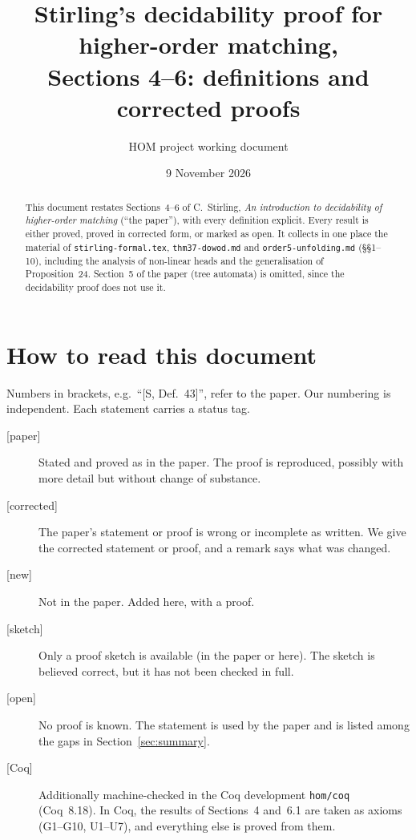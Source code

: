 \documentclass[11pt]{article}
\title{Stirling's decidability proof for higher-order matching,\\
Sections 4--6: definitions and corrected proofs}
\author{HOM project working document}
\date{9 November 2026}
\newcommand{\Paper}{\textsf{[paper]}}
\newcommand{\Fixed}{\textsf{[corrected]}}
\newcommand{\New}{\textsf{[new]}}
\newcommand{\Sketch}{\textsf{[sketch]}}
\newcommand{\Open}{\textsf{\color{red!60!black}[open]}}
\newcommand{\Coq}{\textsf{[Coq]}}
\theoremstyle{plain}
\theoremstyle{definition}
\theoremstyle{remark}
\begin{document}
\maketitle

\begin{abstract}
This document restates Sections~4--6 of C.~Stirling, \emph{An
introduction to decidability of higher-order matching} (``the paper''),
with every definition explicit.  Every result is either proved, proved
in corrected form, or marked as open.  It collects in one place the
material of \texttt{stirling-formal.tex}, \texttt{thm37-dowod.md} and
\texttt{order5-unfolding.md} (\S\S1--10), including the analysis of
non-linear heads and the generalisation of Proposition~24.
Section~5 of the paper (tree automata) is omitted, since the
decidability proof does not use it.
\end{abstract}

\tableofcontents

\section*{How to read this document}

Numbers in brackets, e.g.\ ``[S, Def.~43]'', refer to the paper.  Our
numbering is independent.  Each statement carries a status tag.
\begin{description}
\item[\Paper] Stated and proved as in the paper.  The proof is
  reproduced, possibly with more detail but without change of substance.
\item[\Fixed] The paper's statement or proof is wrong or incomplete as
  written.  We give the corrected statement or proof, and a remark says
  what was changed.
\item[\New] Not in the paper.  Added here, with a proof.
\item[\Sketch] Only a proof sketch is available (in the paper or here).
  The sketch is believed correct, but it has not been checked in full.
\item[\Open] No proof is known.  The statement is used by the paper and
  is listed among the gaps in Section~\ref{sec:summary}.
\item[\Coq] Additionally machine-checked in the Coq development
  \texttt{hom/coq} (Coq~8.18).  In Coq, the results of Sections~4
  and~6.1 are taken as axioms (G1--G10, U1--U7), and everything else is
  proved from them.
\end{description}
\end{document}
